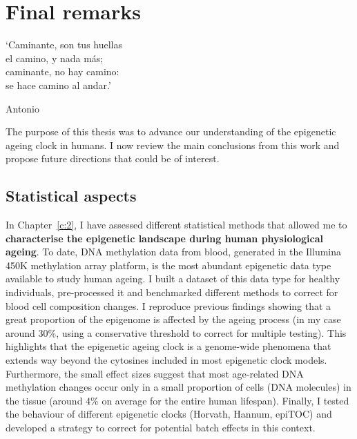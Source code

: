 
\chapter{Final remarks} \label{c:5}

\ifpdf
	\graphicspath{{Chapter5/Figs/pdf/}}
\else
	\graphicspath{{Chapter5/Figs/svg/}}
\fi

\epigraph{`Caminante, son tus huellas \\ el camino, y nada más; \\ caminante, no hay camino: \\ se hace camino al andar.'}{Antonio \citet{Machado}}

\bigskip

The purpose of this thesis was to advance our understanding of the epigenetic ageing clock in humans. I now review the main conclusions from this work and propose future directions that could be of interest.


\section{Statistical aspects}

\bigskip

In Chapter~\ref{c:2}, I have assessed different statistical methods that allowed me to \textbf{characterise the epigenetic landscape during human physiological ageing}. To date, DNA methylation data from blood, generated in the Illumina 450K methylation array platform, is the most abundant epigenetic data type available to study human ageing. I built a dataset of this data type for healthy individuals, pre-processed it and benchmarked different methods to correct for blood cell composition changes. I reproduce previous findings showing that a great proportion of the epigenome is affected by the ageing process (in my case around 30\%, using a conservative threshold to correct for multiple testing). This highlights that the epigenetic ageing clock is a genome-wide phenomena that extends way beyond the cytosines included in most epigenetic clock models. Furthermore, the small effect sizes suggest that most age-related DNA methylation changes occur only in a small proportion of cells (DNA molecules) in the tissue (around 4\% on average for the entire human lifespan). Finally, I tested the behaviour of different epigenetic clocks (Horvath, Hannum, epiTOC) and developed a strategy to correct for potential batch effects in this context.

